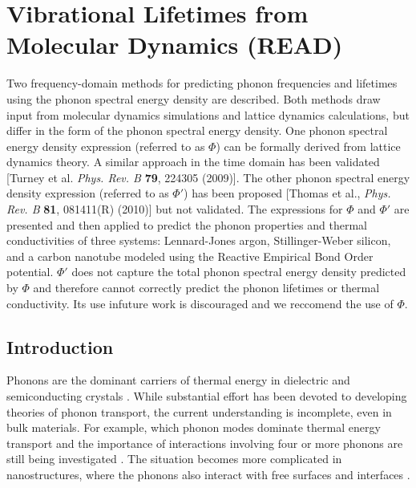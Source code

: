 \chapter{\label{Chapter:SED}Vibrational Lifetimes from Molecular Dynamics 
(READ)}

Two frequency-domain methods for predicting phonon frequencies and 
lifetimes
using the phonon spectral energy density are described. Both methods draw
input from molecular dynamics simulations and lattice dynamics 
calculations,
but differ in the form of the phonon spectral energy density.
One phonon spectral energy density expression (referred to as $\Phi$) 
can be
formally derived from lattice dynamics theory. A similar approach in the
time domain has been validated [Turney et al. \emph{Phys. Rev. B} 
\textbf{79}, 224305
(2009)]. The other phonon spectral energy density expression 
(referred to as
$\Phi'$) has been proposed [Thomas et al., \emph{Phys. Rev. B} 
\textbf{81}, 081411(R) (2010)]
but not validated. The expressions for $\Phi$ and $\Phi'$ are 
presented and then
applied to predict the phonon properties and thermal conductivities 
of three
systems: Lennard-Jones argon, Stillinger-Weber silicon, and a carbon
nanotube modeled using the Reactive Empirical Bond Order potential. 
$\Phi'$ does not capture the total
phonon spectral energy density predicted by $\Phi$ and therefore 
cannot
correctly predict the phonon lifetimes or thermal conductivity. Its 
use infuture work is discouraged and we reccomend the use of $\Phi$.

\section{\label{Section_Introduction}Introduction}
Phonons are the dominant carriers of thermal energy in dielectric
and semiconducting crystals 
\cite{cahill_nanoscale_2003,mcconnell_thermal_2005,
srivastava_physics_1990,wallace_thermodynamics_1972,
maradudin_dynamical_1974,dove_introduction_1993}. While
substantial effort has been devoted to developing theories of phonon
transport, the current understanding is incomplete, even in bulk 
materials. For
example, which phonon modes dominate thermal energy transport and the 
importance of
interactions involving four or more phonons are still being investigated 
\cite{wallace_thermodynamics_1972,srivastava_physics_1990,
broido_intrinsic_2007,esfarjani_heat_2011,cahill_nanoscale_2003}. The
situation becomes more complicated in nanostructures, where the phonons 
also interact with free surfaces and interfaces 
\cite{asheghi_phonon-boundary_1997,balandin_significant_1998,
lee_heat_1997,tian_importance_2011,hochbaum_enhanced_2008,
martin_impact_2009,he_thermal_2011,hopkins_reduction_2011,
landry_complex_2008,mcgaughey_size-dependent_2011,
landry_effect_2009,landry_thermal_2009,landry_effect_2010}.

